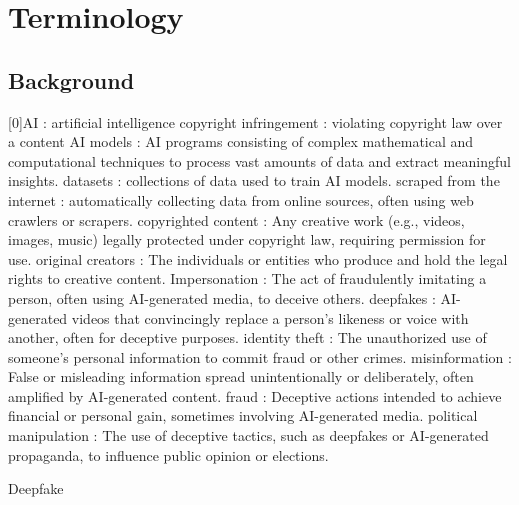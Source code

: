 \section{Terminology}
\label{section:terminology}

\subsection{Background}
\label{subsection:Background}
[0]AI : artificial intelligence \newline
[1]copyright infringement : violating copyright law over a content \newline 
[2]AI models : AI programs consisting of complex mathematical and computational techniques to process vast amounts of data and extract meaningful insights. \newline
[3]datasets : collections of data used to train AI models. \newline
[4]scraped from the internet : automatically collecting data from online sources, often using web crawlers or scrapers. \newline
[5]copyrighted content : Any creative work (e.g., videos, images, music) legally protected under copyright law, requiring permission for use. \newline
[6]original creators : The individuals or entities who produce and hold the legal rights to creative content. \newline
[7]Impersonation : The act of fraudulently imitating a person, often using AI-generated media, to deceive others. \newline
[8]deepfakes : AI-generated videos that convincingly replace a person’s likeness or voice with another, often for deceptive purposes. \newline
[9]identity theft : The unauthorized use of someone’s personal information to commit fraud or other crimes. \newline
[10]misinformation : False or misleading information spread unintentionally or deliberately, often amplified by AI-generated content. \newline
[11]fraud : Deceptive actions intended to achieve financial or personal gain, sometimes involving AI-generated media. \newline
[12]political manipulation : The use of deceptive tactics, such as deepfakes or AI-generated propaganda, to influence public opinion or elections. \newline

Deepfake

